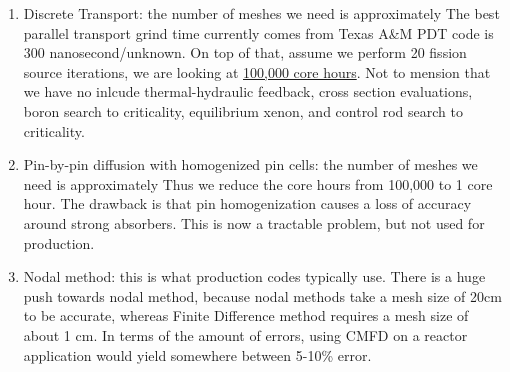 \documentclass{school-22.211-notes}
\begin{document}
\begin{enumerate}
\item  Discrete Transport: the number of meshes we need is approximately
The best parallel transport grind time currently comes from Texas A\&M PDT code is 300 nanosecond/unknown. On top of that, assume we perform 20 fission source iterations, we are looking at \uline{100,000 core hours}. Not to mension that we have no inlcude thermal-hydraulic feedback, cross section evaluations, boron search to criticality, equilibrium xenon, and control rod search to criticality. 

\item Pin-by-pin diffusion with homogenized pin cells: the number of meshes we need is approximately 
Thus we reduce the core hours from 100,000 to 1 core hour. The drawback is that pin homogenization causes a loss of accuracy around strong absorbers. This is now a tractable problem, but not used for production.

\item Nodal method: this is what production codes typically use. There is a huge push towards nodal method, because nodal methods take a mesh size of 20cm to be accurate, whereas Finite Difference method requires a mesh size of about 1 cm. In terms of the amount of errors, using CMFD on a reactor application would yield somewhere between 5-10\% error. 
\end{enumerate}
\end{document}
